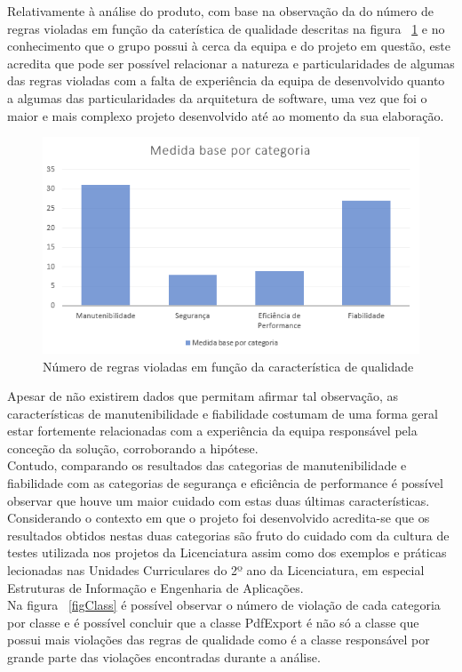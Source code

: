 \documentclass[openany,10pt,a4paper]{article}
\begin{document}
Relativamente à análise do produto, com base na observação da do número de regras violadas em função da caterística de qualidade descritas na figura ~\ref{figQuality} e no conhecimento que o grupo possui à cerca da equipa e do projeto em questão, este acredita que pode ser possível relacionar a natureza e particularidades de algumas das regras violadas com a falta de experiência da equipa de desenvolvido quanto a algumas das particularidades da arquitetura de software, uma vez que foi o maior e mais complexo projeto desenvolvido até ao momento da sua elaboração.\\ 

\begin{figure}[H]
	\centering
	\includegraphics[width=0.7\linewidth]{graph_results_product.PNG}
	\caption{Número de regras violadas em função da característica de qualidade \small}
	\label{figQuality}
\end{figure}

Apesar de não existirem dados que permitam afirmar tal observação, as características de manutenibilidade e fiabilidade costumam de uma forma geral estar fortemente relacionadas com a experiência da equipa responsável pela conceção da solução, corroborando a hipótese.\\
Contudo, comparando os resultados das categorias de manutenibilidade e fiabilidade com as categorias de segurança e eficiência de performance é possível observar que houve um maior cuidado com estas duas últimas características. Considerando o contexto em que o projeto foi desenvolvido acredita-se que os resultados obtidos nestas duas categorias são fruto do cuidado com da cultura de testes utilizada nos projetos da Licenciatura assim como dos exemplos e práticas lecionadas nas Unidades Curriculares do 2º ano da Licenciatura, em especial Estruturas de Informação e Engenharia de Aplicações. \\
Na figura ~\ref{figClass} é possível observar o número de violação de cada categoria por classe e é possível concluir que a classe PdfExport é não só a classe que possui mais violações das regras de qualidade como é a classe responsável por grande parte das violações encontradas durante a análise.
\end{document}
